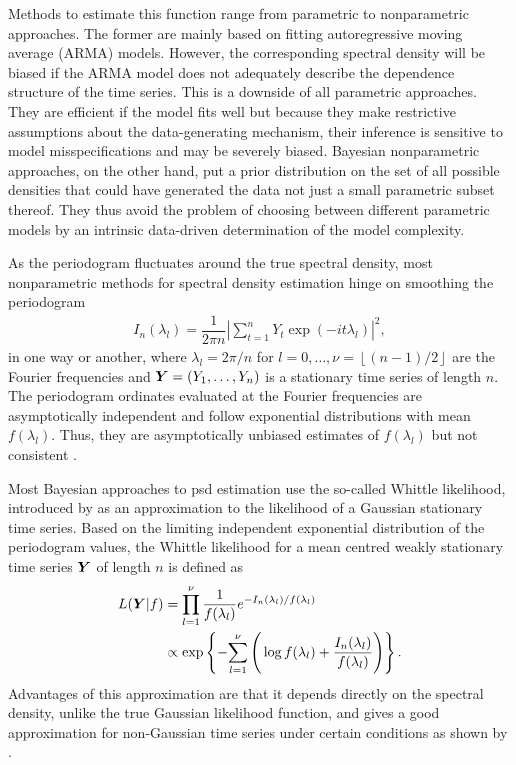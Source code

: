 \documentclass[twocolumn,final]{svjour3}
\newcommand{\bm}[1]{\mbox{\boldmath $#1$}}
\newcommand{\pmr}{ \color{red}}
\begin{document}
Methods to estimate this function range from parametric to nonparametric approaches.  The former are mainly based on fitting  autoregressive moving average (ARMA) models. However, the corresponding spectral density will be biased if the ARMA model does not adequately describe the dependence structure of the time series. This is a downside of all parametric approaches.
They are efficient if the model fits well but because they make restrictive assumptions about the data-generating mechanism, their inference is sensitive to model misspecifications and may  be severely biased. 
Bayesian nonparametric approaches, on the other hand, put a prior distribution on the set of all possible densities that could have generated the data not just a small parametric subset thereof. They thus avoid the problem of choosing between different parametric models  by an intrinsic data-driven determination of the model complexity.

As the periodogram fluctuates around the true spectral density, most  nonparametric methods for spectral density estimation hinge on  smoothing the periodogram
\begin{align*}
I_n(\lambda_l) = \dfrac{1}{2 \pi n} \left| \sum_{t=1}^{n} Y_t \exp \left( -i t \lambda_l\right)\right|^2,
\end{align*}
in one way or another, where $ \lambda_l=2\pi/n$ for $l=0,\ldots,\nu = \left\lfloor (n-1)/2 \right\rfloor$ are the Fourier frequencies and $\bm{Y}=(Y_1,\ldots,Y_n)$ is a stationary time series of length $n$. {\pmr The periodogram ordinates evaluated at the Fourier frequencies  are asymptotically independent and follow exponential distributions with mean $f(\lambda_l)$.  Thus, they are asymptotically  unbiased estimates of $f(\lambda_l)$  but not consistent \citep{Brockwell:1986}.}


Most Bayesian approaches to psd estimation use the so-called Whittle likelihood, introduced by \cite{Whittle:1957} as an approximation to the likelihood of a Gaussian stationary time series.  Based on the  limiting independent exponential distribution of the periodogram values, the Whittle likelihood for a mean centred weakly stationary time series $\bm{Y}$ of length $n$ is defined as
\begin{align}
L(\bm{Y} | f) &= \prod_{l=1}^{\nu}\dfrac{1}{f(\lambda_{l})} e^{-I_n(\lambda_l)/f(\lambda_l)}  \nonumber \\
&\propto \exp \left\{ -\! \sum_{l=1}^{\nu} \Bigg( \log f(\lambda_l) + \dfrac{I_{n}(\lambda_l)}{f(\lambda_l)} \Bigg) \right\}.\label{eq:whittle_like}
\end{align}
 Advantages of this approximation are that it depends directly on the spectral density, unlike the true Gaussian likelihood function, and gives a good approximation for non-Gaussian time series under certain conditions as shown by \cite{ShaoXiaofeng2007ASTf}.
\end{document}
